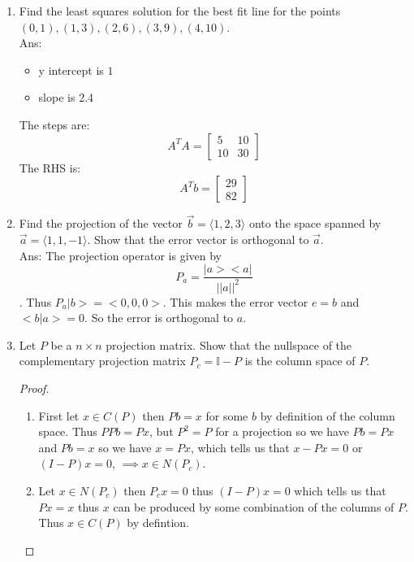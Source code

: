 \documentclass[10pt, a4paper]{article}
\theoremstyle{break}
\begin{document}
\begin{enumerate}
\begin{proof}
Taken together we have that $N(A)=N(A^TA)$. 
\end{proof}
\item Find the least squares solution for the best fit line for the points $(0,1), (1,3), (2,6),(3,9),(4,10)$.  \\
Ans:
\begin{itemize}
\item y intercept is $1$
\item slope is 2.4
\end{itemize}
The steps are:
\begin{equation}
A^TA=
\begin{bmatrix}
5&10\\
10&30
\end{bmatrix}
\end{equation}
The RHS is:
\begin{equation}
A^Tb=
\begin{bmatrix}
29 \\
82
\end{bmatrix}
\end{equation}




\item Find the projection of the vector $\vec{b}=\langle 1,2,3 \rangle$ onto the space spanned by $\vec{a}=\langle 1,1,-1 \rangle$. Show that the error vector is orthogonal to $\vec{a}$. \\
Ans: The projection operator is given by $$P_a=\frac{|a><a|}{||a||^2}$$. Thus $P_a |b>=<0,0,0>$. This makes the error vector $e=b$ and $<b|a>=0$. So the error is orthogonal to $a$. 





\item Let $P$ be a $n \times n$ projection matrix. Show that the nullspace of the complementary projection matrix $P_c=\mathbb{I}-P$ is the column space of $P$. 

\begin{proof}
\begin{enumerate}
\item First let $x \in C(P)$ then $Pb=x$ for some $b$ by definition of the column space. Thus $PPb=Px$, but $P^2=P$ for a projection so we have $Pb=Px$ and $Pb=x$ so we have $x=Px$, which tells us that $x-Px=0$ or $(I-P)x=0$, $\implies x \in N(P_c)$.
\item Let $x \in N(P_c)$ then $P_cx=0$ thus $(I-P)x=0$ which tells us that $Px=x$ thus $x$ can be produced by some combination of the columns of $P$. Thus $x\in C(P)$ by defintion. 
\end{enumerate}
\end{proof}



\end{enumerate}
\end{document}
